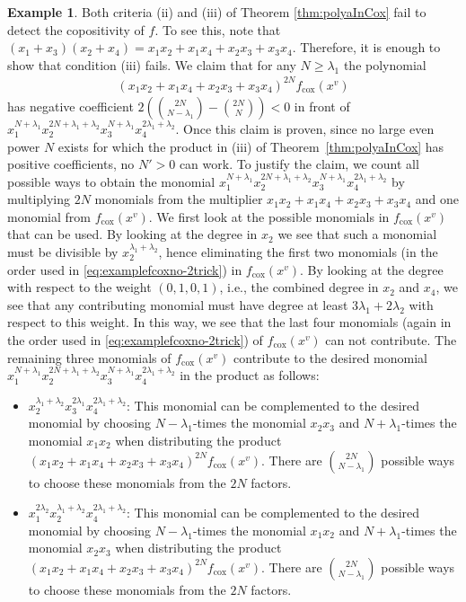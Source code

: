 \documentclass[a4paper,11pt]{amsart}
\theoremstyle{definition}
\newtheorem{example}[theorem]{Example}
\newcommand{\cox}{\mathrm{cox}}
\begin{document}
\begin{example}
Both criteria (ii) and (iii) of Theorem \ref{thm:polyaInCox} fail to detect the copositivity of $f$. 
To see this, note that $(x_1+x_3)(x_2+x_4)=x_1x_2+x_1x_4+x_2x_3+x_3x_4$. Therefore, it is enough to show that condition (iii) fails.
We claim that for any $N\geq \lambda_1$ the polynomial
\begin{align*}
(x_1x_2+x_1x_4+x_2x_3+x_3x_4)^{2N}f_\cox(x^v)
\end{align*}
 has negative coefficient $2\left(\binom{2N}{N-\lambda_1}-\binom{2N}{N}\right)<0$ in front of $x_1^{N+\lambda_1}x_2^{2N+\lambda_1+\lambda_2}x_3^{N+\lambda_1}x_4^{2\lambda_1+\lambda_2}$. Once this claim is proven, since no large even power $N$ exists for which the product in (iii) of Theorem~\ref{thm:polyaInCox} has positive coefficients, no $N'>0$ can work.
To justify the claim, we count all possible ways to obtain the monomial $x_1^{N+\lambda_1}x_2^{2N+\lambda_1+\lambda_2}x_3^{N+\lambda_1}x_4^{2\lambda_1+\lambda_2}$ by multiplying $2N$ monomials from the multiplier $x_1x_2+x_1x_4+x_2x_3+x_3x_4$ and one monomial from $f_\cox(x^v)$. We first look at the possible monomials in $f_\cox(x^v)$ that can be used. By looking at the degree in $x_2$ we see that such a monomial must be divisible by $x_2^{\lambda_1+\lambda_2}$, hence eliminating the first two monomials (in the order used in \eqref{eq:examplefcoxno-2trick}) in $f_\cox(x^v)$. By looking at the degree with respect to the weight $(0,1,0,1)$, i.e., the combined degree in $x_2$ and $x_4$, we see that any contributing monomial must have degree at least $3\lambda_1+2\lambda_2$ with respect to this weight. In this way, we see that the last four monomials (again in the order used in \eqref{eq:examplefcoxno-2trick}) of $f_\cox(x^v)$ can not contribute. The remaining three monomials of $f_\cox(x^v)$ contribute to the desired monomial $x_1^{N+\lambda_1}x_2^{2N+\lambda_1+\lambda_2}x_3^{N+\lambda_1}x_4^{2\lambda_1+\lambda_2}$ in the product as follows: \begin{itemize}
    \item {$x_2^{\lambda_1+\lambda_2}x_3^{2\lambda_1}x_4^{2\lambda_1+\lambda_2}$:} This monomial can be complemented to the desired monomial  by choosing $N-\lambda_1$-times the monomial $x_2x_3$ and $N+\lambda_1$-times the monomial $x_1x_2$ when distributing the product $(x_1x_2+x_1x_4+x_2x_3+x_3x_4)^{2N}f_\cox(x^v)$. There are $\binom{2N}{N-\lambda_1}$ possible ways to choose these monomials from the $2N$ factors.
    \item {$x_1^{2\lambda_2}x_2^{\lambda_1+\lambda_2}x_4^{2\lambda_1+\lambda_2}$:} This monomial can be complemented to the desired monomial by choosing $N-\lambda_1$-times the monomial $x_1x_2$ and $N+\lambda_1$-times the monomial $x_2x_3$ when distributing the product $(x_1x_2+x_1x_4+x_2x_3+x_3x_4)^{2N}f_\cox(x^v)$. There are $\binom{2N}{N-\lambda_1}$ possible ways to choose these monomials from the $2N$ factors.

\end{itemize}
\end{example}
\end{document}
